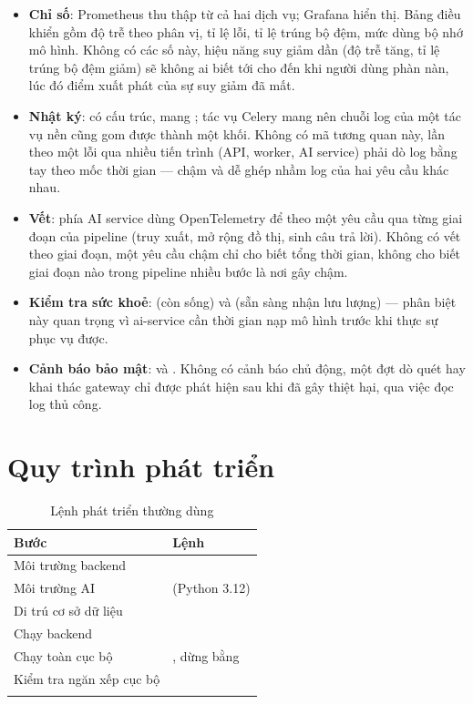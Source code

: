\begin{itemize}[leftmargin=1.4em]
  \item \textbf{Chỉ số}: Prometheus thu thập từ cả hai dịch vụ; Grafana hiển thị. Bảng
  điều khiển gồm độ trễ theo phân vị, tỉ lệ lỗi, tỉ lệ trúng bộ đệm, mức dùng bộ nhớ mô
  hình. Không có các số này, hiệu năng suy giảm dần (độ trễ tăng, tỉ lệ trúng bộ đệm giảm)
  sẽ không ai biết tới cho đến khi người dùng phàn nàn, lúc đó điểm xuất phát của sự suy
  giảm đã mất.
  \item \textbf{Nhật ký}: có cấu trúc, mang ; tác vụ Celery mang
   nên chuỗi log của một tác vụ nền cũng gom được thành một khối. Không
  có mã tương quan này, lần theo một lỗi qua nhiều tiến trình (API, worker, AI service)
  phải dò log bằng tay theo mốc thời gian — chậm và dễ ghép nhầm log của hai yêu cầu khác
  nhau.
  \item \textbf{Vết}:  phía AI service dùng OpenTelemetry để theo một
  yêu cầu qua từng giai đoạn của pipeline (truy xuất, mở rộng đồ thị, sinh câu trả lời).
  Không có vết theo giai đoạn, một yêu cầu chậm chỉ cho biết tổng thời gian, không cho
  biết giai đoạn nào trong pipeline nhiều bước là nơi gây chậm.
  \item \textbf{Kiểm tra sức khoẻ}:  (còn sống) và 
  (sẵn sàng nhận lưu lượng) — phân biệt này quan trọng vì ai-service cần thời gian nạp mô
  hình trước khi thực sự phục vụ được.
  \item \textbf{Cảnh báo bảo mật}:  và
  . Không có cảnh báo chủ động, một đợt dò quét hay
  khai thác gateway chỉ được phát hiện sau khi đã gây thiệt hại, qua việc đọc log thủ công.
\end{itemize}

\section{Quy trình phát triển}

\begin{longtable}{L{4.0cm} L{9.6cm}}
\toprule
\textbf{Bước} & \textbf{Lệnh}\\
\midrule
\endhead
Môi trường backend & \\
Môi trường AI &  (Python 3.12)\\
Di trú cơ sở dữ liệu & \\
Chạy backend & \\
Chạy toàn cục bộ & , dừng bằng \\
Kiểm tra ngăn xếp cục bộ & \\
\bottomrule
\caption{Lệnh phát triển thường dùng}
\end{longtable}

